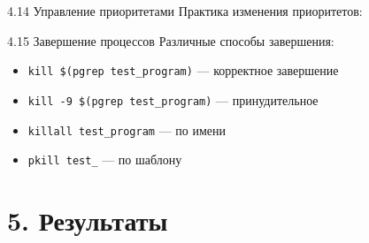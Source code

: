 \documentclass[
  ignorenonframetext,
  aspectratio=169,
  russian,
]{beamer}
\newenvironment{Shaded}{\begin{snugshade}}{\end{snugshade}}
\newcommand{\AttributeTok}[1]{\textcolor[rgb]{0.40,0.45,0.13}{#1}}
\newcommand{\CommentTok}[1]{\textcolor[rgb]{0.37,0.37,0.37}{#1}}
\newcommand{\ExtensionTok}[1]{\textcolor[rgb]{0.00,0.23,0.31}{#1}}
\newcommand{\FunctionTok}[1]{\textcolor[rgb]{0.28,0.35,0.67}{#1}}
\newcommand{\NormalTok}[1]{\textcolor[rgb]{0.00,0.23,0.31}{#1}}
\newcommand{\OperatorTok}[1]{\textcolor[rgb]{0.37,0.37,0.37}{#1}}
\newcommand{\VariableTok}[1]{\textcolor[rgb]{0.07,0.07,0.07}{#1}}
\providecommand{\tightlist}{%
  \setlength{\itemsep}{0pt}\setlength{\parskip}{0pt}}
\begin{document}
\begin{frame}[fragile]{4.14 Управление приоритетами}
\label{ux443ux43fux440ux430ux432ux43bux435ux43dux438ux435-ux43fux440ux438ux43eux440ux438ux442ux435ux442ux430ux43cux438}
Практика изменения приоритетов:

\begin{Shaded}
\end{Shaded}
\end{frame}

\begin{frame}[fragile]{4.15 Завершение процессов}
\label{ux437ux430ux432ux435ux440ux448ux435ux43dux438ux435-ux43fux440ux43eux446ux435ux441ux441ux43eux432}
Различные способы завершения:

\begin{itemize}[<+->]
\tightlist
\item
  \texttt{kill\ \$(pgrep\ test\_program)} --- корректное завершение
\item
  \texttt{kill\ -9\ \$(pgrep\ test\_program)} --- принудительное
\item
  \texttt{killall\ test\_program} --- по имени
\item
  \texttt{pkill\ test\_} --- по шаблону
\end{itemize}
\end{frame}

\section{5. Результаты}\label{ux440ux435ux437ux443ux43bux44cux442ux430ux442ux44b}
\end{document}
